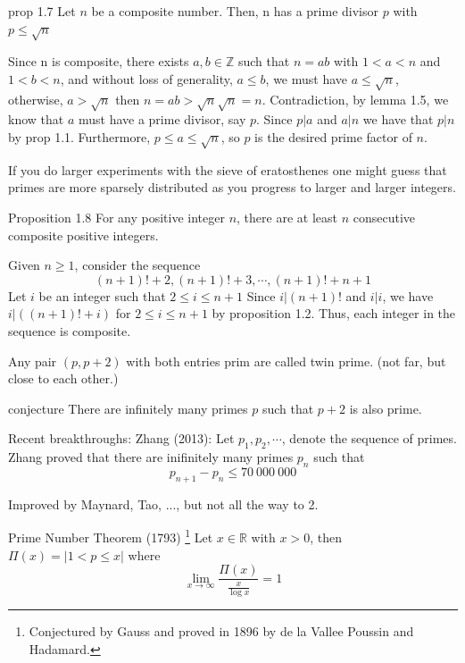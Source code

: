 \begin{state}{prop 1.7}
    Let $n$ be a composite number. Then, n has a prime divisor $p$ with $p\leq \sqrt{n}$
\end{state}
\begin{subprove}
    Since n is composite, there exists $a,b\in\mathbb{Z}$ such that $n=ab$ with $1<a<n$ and $1<b<n$, 
    and without loss of generality, $a\leq b$, we must have $a \leq \sqrt{n}$, otherwise, $a>\sqrt{n}$ 
    then $n=ab>\sqrt{n}\sqrt{n}=n$. Contradiction, by lemma 1.5, 
    we know that $a$ must have a prime divisor, say $p$. Since $p|a$ and $a|n$ we have that $p|n$ by prop 1.1.
    Furthermore, $p \leq a \leq \sqrt{n}$, so $p$ is the desired prime factor of $n$. 
\end{subprove}

If you do larger experiments with the sieve of eratosthenes one might 
guess that primes are 
more sparsely distributed as you progress to larger and larger integers.


\begin{state} {Proposition 1.8}
    For any positive integer $n$, there are at least $n$ consecutive composite positive integers.
\end{state}
\begin{subprove}
    Given $n\geq 1$, consider the sequence
    $$(n+1)! + 2, (n+1)! + 3,\cdots,(n+1)! + n+1$$
    Let $i$ be an integer such that $2\leq i \leq n+1$ 
    Since $i|(n+1)!$ and $i|i$, we have $i|((n+1)!+i)$ for $2\leq i \leq n+1$ by proposition 1.2.
    Thus, each integer in the sequence is composite.
\end{subprove}

\begin{state}{ }
    Any pair $\left(p,p+2\right)$ with both entries prim are called twin prime. (not far, but close to each other.)
\end{state}

\begin{state}{conjecture}
    There are infinitely many primes $p$ such that $p+2$ is also prime.
\end{state}

Recent breakthroughs: Zhang (2013): Let $p_1, p_2, \cdots$, denote the sequence of primes. 
Zhang proved that there are inifinitely many primes $p_n$ such that
$$p_{n+1}-p_{n} \leq 70~000~000$$

Improved by Maynard, Tao, ..., but not all the way to 2.


\begin{state}{Prime Number Theorem (1793) \footnote{Conjectured by Gauss and proved in 1896 by de la Vallee Poussin and Hadamard.}}
    Let $x\in \mathbb{R}$ with $x>0$, then $\Pi (x)=\left|{1<p\leq x}\right|$ where
    $$\lim_{x\to \infty}{\frac{\Pi (x)}{\frac{x}{\log{x}}}} = 1$$
\end{state}

